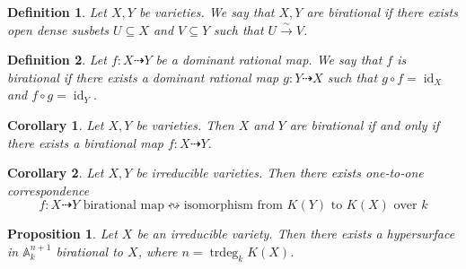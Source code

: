 \documentclass{ctexart}
\newtheorem{definition}{Definition}[section]
\newtheorem{proposition}{Proposition}[section]
\newtheorem{corollary}{Corollary}[section]
\newcommand{\identity}{\operatorname{id}}
\newcommand{\trdeg}{\operatorname{trdeg}}
\begin{document}
\begin{definition}
    Let $X, Y$ be varieties.
    We say that $X, Y$ are birational if there exists open dense susbets $U \subseteq X$ and $V \subseteq Y$ such that $U \overset{\sim}{\rightarrow} V$.
\end{definition}
\begin{definition}
    Let $f: X \dashrightarrow Y$ be a dominant rational map.
    We say that $f$ is birational if there exists a dominant rational map $g: Y \dashrightarrow X$ such that $g \circ f = \identity_{X}$ and $f \circ g = \identity_{Y}$.
\end{definition}
\begin{corollary}
    Let $X, Y$ be varieties.
    Then $X$ and $Y$ are birational if and only if there exists a birational map $f: X \dashrightarrow Y$.
    \label{Corollary 2.2}
\end{corollary}
\begin{corollary}
    Let $X, Y$ be irreducible varieties.
    Then there exists one-to-one correspondence 
    \begin{equation*}
        f: X \dashrightarrow Y \text{ birational map} \leftrightsquigarrow \text{isomorphism from $K(Y)$ to $K(X)$ over $k$}
    \end{equation*}
    \label{Corollary 2.3}
\end{corollary}
\vspace{-\baselineskip} %
\vspace{-\baselineskip} %
\begin{proposition}
    Let $X$ be an irreducible variety.
    Then there exists a hypersurface in $\mathbb{A}_{k}^{n + 1}$ birational to $X$,
    where $n = \trdeg_{k}K(X)$.
    \label{Proposition 2.4}
\end{proposition}
\end{document}
